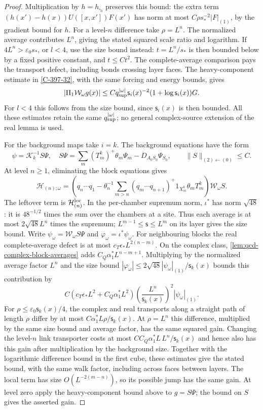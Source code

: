 \documentclass[11pt,letterpaper,reqno]{amsart}
\theoremstyle{definition}
\theoremstyle{remark}
\begin{document}
\begin{proof}
Multiplication by $h=h_{\square_0}$ preserves this bound: the extra
term $(h(x')-h(x))U([x,x'])F(x')$ has norm at most
$C\rho s_*^{-2}|F|_{(1)}$, by the gradient bound for $h$.
For a level-$n$ difference take $\rho=L^n$. The normalized
average contributes $L^n$, giving the stated squared scale ratio
and logarithm. If $4L^n>\varepsilon_0s_*$, or $l<4$, use the size
bound instead: $t=L^n/s_*$ is then bounded below by a fixed positive
constant, and $t\le Ct^2$. The complete-average comparison pays
the transport defect, including bonds crossing layer faces.
The heavy-component estimate in \cref{C-397-32}, with the same forcing
and energy bounds, gives
\[
 |\Pi_1\mathcal W_\omega g(x)|
 \le Cq_{\rm sup}^{|\omega|}\mathsf s_i(x)^{-2}
              (1+\log\mathsf s_i(x))G.
\]
For $l<4$ this follows from the size bound, since $\mathsf s_i(x)$
is then bounded.
All these estimates retain the same $q_{\rm sup}^{|\omega|}$;
no general complex-source extension of the real lemma is used.

For the background maps take $i=k$. The background equations have the form
\[
 \psi=\mathcal K_k^{-1}S\Psi,
 \quad S\Psi=\sum_m(T_m^k)^+\theta_m\Psi_m-D_{A_0S_0}\Psi_{S_0},
 \qquad\|S\|_{(2)\leftarrow(0)}\le C.
\]
At level $n\ge1$, eliminating the block equations gives
\[
 \mathcal H_{(n);\omega}=
 \left(q_n\cdots q_1-\theta_n^{-1}
 \sum_{m>n}(q_m\cdots q_{n+1})^+
                     1_{X_m^k}\theta_mT_m^k\right)
                 \mathcal W_\omega S.
\]
The leftover term is $\mathcal H^{\rm loc}_{(n)}$.
In the per-chamber supremum norm, $\iota^*$ has norm $\sqrt{48}$:
it is $48^{-1/2}$ times the sum over the chambers at a site.
Thus each average is at most $2\sqrt{48}L^n$ times the supremum;
$L^{m-1}\le\mathsf s\le L^m$ on its layer gives the size bound.
Write $\psi_\omega=\mathcal W_\omega S\Psi$ and
$\varphi_\omega=\iota^*\psi_\omega$.
For neighbouring blocks the real complete-average defect is at most
$c_T\epsilon_*L^{2(n-m)}$. On the complex class,
\cref{lem:qcd-complex-block-averages} adds
$C_Q\alpha_1^*L^{n-m+1}$. Multiplying by the normalized average
factor $L^n$ and the size bound
$|\varphi_\omega|\le2\sqrt{48}|\psi_\omega|_{(1)}/\mathsf s_k(x)$
bounds this contribution by
\[
 C(c_T\epsilon_*L^2+C_Q\alpha_1^*L^2)
 \left(\frac{L^n}{\mathsf s_k(x)}\right)^2
 |\psi_\omega|_{(1)}.
\]
For $\rho\le\varepsilon_0\mathsf s_k(x)/4$, the complex and
real transports along a straight path of length $\rho$ differ by at most
$C\alpha_1^*L\rho/\mathsf s_k(x)$. At $\rho=L^n$ this
difference, multiplied by the same size bound and average factor,
has the same squared gain. Changing the level-$n$ link transporter
costs at most $CC_Q\alpha_1^*L\,L^n/\mathsf s_k(x)$ and hence
also has this gain after multiplication by the background size.
Together with the logarithmic difference bound in the first cube,
these estimates give the stated bound, with the same walk factor,
including across faces between layers. The local term has size
$O(L^{-2(m-n)})$, so
its possible jump has the same gain.  At level zero apply the
heavy-component bound above to $g=S\Psi$; the bound on $S$ gives
the asserted gain.


\end{proof}
\end{document}
